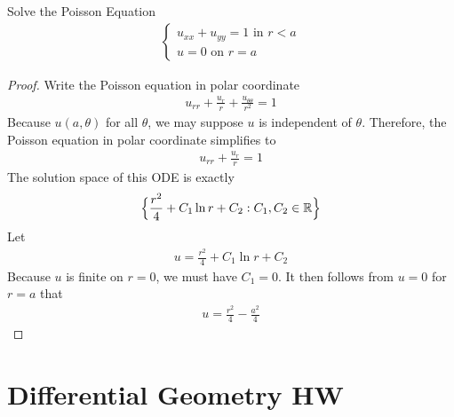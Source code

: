 \documentclass{report}
\begin{document}
\begin{question}{}{}
Solve the Poisson Equation
\begin{align*}
\begin{cases}
  u_{xx}+ u_{yy}=1 \text{ in }r<a \\
  u=0\text{ on }r=a
\end{cases}
\end{align*}
\end{question}
\begin{proof}
Write the Poisson equation in polar coordinate 
\begin{align*}
u_{rr}+ \frac{u_r}{r} + \frac{u_{\theta \theta}}{r^2}=1
\end{align*}
Because $u(a, \theta)$ for all $\theta$, we may suppose $u$ is independent of  $\theta$. Therefore, the Poisson equation in polar coordinate simplifies to 
\begin{align*}
u_{rr} + \frac{u_r}{r} = 1
\end{align*}
The solution space of this ODE is exactly  
\begin{align*}
\Big\{  \frac{r^2}{4}+ C_1 \ln r+ C_2 : C_1, C_2 \in\mathbb{R} \Big\}
\end{align*}
Let 
\begin{align*}
u= \frac{r^2}{4}+ C_1 \ln r + C_2
\end{align*}
Because $u$ is finite on $r=0$, we must have  $C_1=0$. It then follows from  $u=0$ for  $r=a$ that   
\begin{align*}
u= \frac{r^2}{4}- \frac{a^2}{4}
\end{align*}
\end{proof}
\chapter{Differential Geometry HW} 
\end{document}

